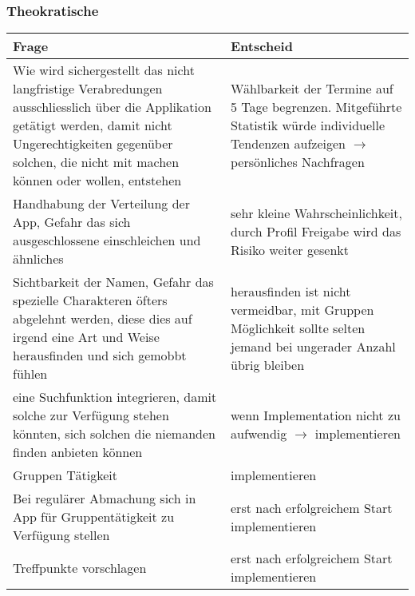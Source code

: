 \subsubsection{Theokratische}

\begin{tabularx}{\textwidth}{X|X}
Frage & Entscheid \\\hline
Wie wird sichergestellt das nicht langfristige Verabredungen ausschliesslich über die Applikation getätigt werden, damit nicht Ungerechtigkeiten gegenüber solchen, die nicht mit machen können oder wollen, entstehen & Wählbarkeit der Termine auf 5 Tage begrenzen. Mitgeführte Statistik würde individuelle Tendenzen aufzeigen $\rightarrow$ persönliches Nachfragen \\\hline
Handhabung der Verteilung der App, Gefahr das sich ausgeschlossene einschleichen und ähnliches & sehr kleine Wahrscheinlichkeit, durch Profil Freigabe wird das Risiko weiter gesenkt\\\hline
Sichtbarkeit der Namen, Gefahr das spezielle Charakteren öfters abgelehnt werden, diese dies auf irgend eine Art und Weise herausfinden und sich gemobbt fühlen & herausfinden ist nicht vermeidbar, mit Gruppen Möglichkeit sollte selten jemand bei ungerader Anzahl übrig bleiben\\\hline
eine Suchfunktion integrieren, damit solche zur Verfügung stehen könnten, sich solchen die niemanden finden anbieten können & wenn Implementation nicht zu aufwendig $\rightarrow$ implementieren\\\hline
Gruppen Tätigkeit & implementieren \\\hline
Bei regulärer Abmachung sich in App für Gruppentätigkeit zu Verfügung stellen & erst nach erfolgreichem Start implementieren\\\hline
Treffpunkte vorschlagen & erst nach erfolgreichem Start implementieren\\
\end{tabularx}